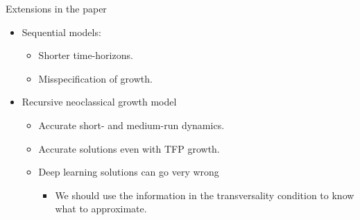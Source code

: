 \documentclass[aspectratio=169,10pt]{beamer}
\begin{document}
\begin{frame}{Extensions in the paper}
	\begin{itemize}
		\item Sequential models:
		\begin{itemize}
			\item Shorter time-horizons.
			\smallskip
			\item Misspecification of growth.\\
			\smallskip
		\end{itemize}
		\smallskip
		\item Recursive neoclassical growth model
		\begin{itemize}
			\item Accurate short- and medium-run dynamics.
			\smallskip
			\item Accurate solutions even with TFP growth.
			\smallskip
			\item Deep learning solutions can go very wrong
			\begin{itemize}
				\smallskip
				\item We should use the information in the transversality condition to know what to approximate.
			\end{itemize} 
		\end{itemize}
	\end{itemize}
\end{frame}
\end{document}
